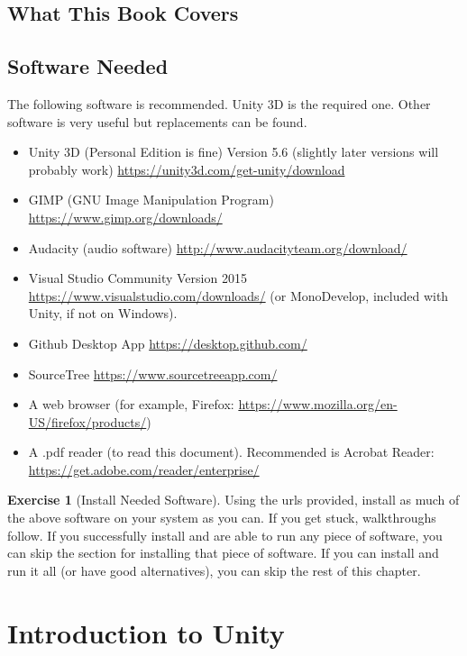 \documentclass[12pt]{amsbook}
\theoremstyle{definition}
\newtheorem{exercise}{Exercise}[chapter]
\theoremstyle{remark}
\numberwithin{figure}{chapter}
\numberwithin{table}{chapter}
\numberwithin{section}{chapter}
\numberwithin{equation}{section}
\begin{document}
\section{What This Book Covers}

\section{Software Needed}

The following software is recommended.  Unity 3D is the required one.  Other software is very useful but replacements can be found.

\begin{itemize} 
\item Unity 3D (Personal Edition is fine) Version 5.6 (slightly later versions will probably work) \url{https://unity3d.com/get-unity/download}
\item GIMP (GNU Image Manipulation Program) \url{https://www.gimp.org/downloads/}
\item Audacity (audio software) \url{http://www.audacityteam.org/download/}
\item Visual Studio Community Version 2015 \url{https://www.visualstudio.com/downloads/} (or MonoDevelop, included with Unity, if not on Windows).
\item Github Desktop App \url{https://desktop.github.com/}
\item SourceTree \url{https://www.sourcetreeapp.com/}
\item A web browser (for example, Firefox: \url{https://www.mozilla.org/en-US/firefox/products/})
\item A .pdf reader (to read this document).  Recommended is Acrobat Reader: \url{https://get.adobe.com/reader/enterprise/}
\end{itemize}

\begin{exercise}[Install Needed Software]
Using the urls provided, install as much of the above software on your system as you can.  If you get stuck, walkthroughs follow.  If you successfully install and are able to run any piece of software, you can skip the section for installing that piece of software.  If you can install and run it all (or have good alternatives), you can skip the rest of this chapter.
\end{exercise}

\chapter{Introduction to Unity}
\end{document}

